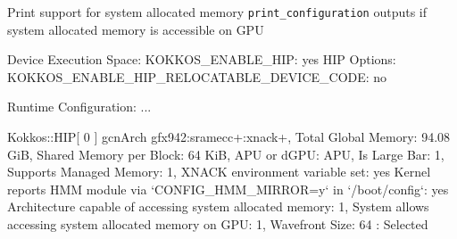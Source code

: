 \begin{frame}[fragile]{Print support for system allocated memory}
  \texttt{print\_configuration} outputs if system allocated memory is accessible on GPU

  \vspace{5pt}

  \begin{code}
    Device Execution Space:
      KOKKOS_ENABLE_HIP: yes
    HIP Options:
      KOKKOS_ENABLE_HIP_RELOCATABLE_DEVICE_CODE: no
    
    Runtime Configuration:
      ...

    Kokkos::HIP[ 0 ] gcnArch gfx942:sramecc+:xnack+, Total Global Memory: 94.08 GiB,
    Shared Memory per Block: 64 KiB,
    APU or dGPU: APU, Is Large Bar: 1, Supports Managed Memory: 1,
    XNACK environment variable set: yes
    Kernel reports HMM module via `CONFIG_HMM_MIRROR=y` in `/boot/config`: yes
    Architecture capable of accessing system allocated memory: 1,
    System allows accessing system allocated memory on GPU: 1,
    Wavefront Size: 64 : Selected
  \end{code}
    
\end{frame}
